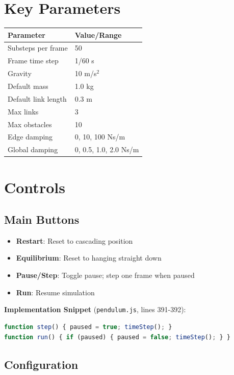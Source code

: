 \documentclass[12pt,a4paper]{article}
\begin{document}
\section{Key Parameters}

\begin{center}
\small
\begin{tabular}{|l|l|}
\hline
\textbf{Parameter} & \textbf{Value/Range} \\
\hline
Substeps per frame & 50 \\
Frame time step & 1/60 s \\
Gravity & 10 m/s$^2$ \\
Default mass & 1.0 kg \\
Default link length & 0.3 m \\
Max links & 3 \\
Max obstacles & 10 \\
Edge damping & 0, 10, 100 Ns/m \\
Global damping & 0, 0.5, 1.0, 2.0 Ns/m \\
\hline
\end{tabular}
\end{center}

\section{Controls}

\subsection{Main Buttons}

\begin{itemize}
\item \textbf{Restart}: Reset to cascading position
\item \textbf{Equilibrium}: Reset to hanging straight down
\item \textbf{Pause/Step}: Toggle pause; step one frame when paused
\item \textbf{Run}: Resume simulation
\end{itemize}

\noindent\textbf{Implementation Snippet} (\texttt{pendulum.js}, lines 391-392):
\begin{lstlisting}[language=JavaScript]
function step() { paused = true; timeStep(); }
function run() { if (paused) { paused = false; timeStep(); } }
\end{lstlisting}

\subsection{Configuration}
\end{document}
